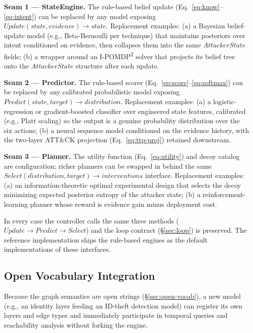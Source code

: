 \documentclass[11pt]{article}
\begin{document}
\textbf{Seam 1 --- StateEngine.} The rule-based belief update
(Eq.~\ref{eq:know}--\ref{eq:intent}) can be replaced by any model exposing
$\mathit{Update}(\mathit{state}, \mathit{evidence})
\to \mathit{state}$. Replacement examples: (a) a Bayesian belief-update
model (e.g., Beta-Bernoulli per technique) that maintains posteriors over
intent conditioned on evidence, then collapses them into the same
$\mathit{AttackerState}$ fields; (b) a wrapper around an
I-POMDP\textsuperscript{2} solver that projects its belief tree onto the
$\mathit{AttackerState}$ structure after each update.

\textbf{Seam 2 --- Predictor.} The rule-based scorer
(Eq.~\ref{eq:score}--\ref{eq:softmax}) can be replaced by any calibrated
probabilistic model exposing
$\mathit{Predict}(\mathit{state}, \mathit{target}) \to
\mathit{distribution}$. Replacement examples: (a) a logistic-regression or
gradient-boosted classifier over engineered state features, calibrated
(e.g., Platt scaling) so the output is a genuine probability distribution
over the six actions; (b) a neural sequence model conditioned on the
evidence history, with the two-layer ATT\&CK projection
(Eq.~\ref{eq:ttp-proj}) retained downstream.

\textbf{Seam 3 --- Planner.} The utility function (Eq.~\ref{eq:utility}) and
decoy catalog are configuration; richer planners can be swapped in behind
the same
$\mathit{Select}(\mathit{distribution}, \mathit{target}) \to
\mathit{interventions}$ interface. Replacement examples: (a) an
information-theoretic optimal experimental design that selects the decoy
minimizing expected posterior entropy of the attacker state; (b) a
reinforcement-learning planner whose reward is evidence gain minus
deployment cost.

In every case the controller calls the same three methods
($\mathit{Update} \to \mathit{Predict} \to \mathit{Select}$) and the loop
contract (\S\ref{sec:loop}) is preserved. The reference implementation
ships the rule-based engines as the default implementations of these
interfaces.

\subsection{Open Vocabulary Integration}

Because the graph semantics are open strings (\S\ref{sec:open-vocab}), a new
model (e.g., an identity layer feeding an ID-theft detection model) can
register its own layers and edge types and immediately participate in
temporal queries and reachability analysis without forking the engine.
\end{document}
